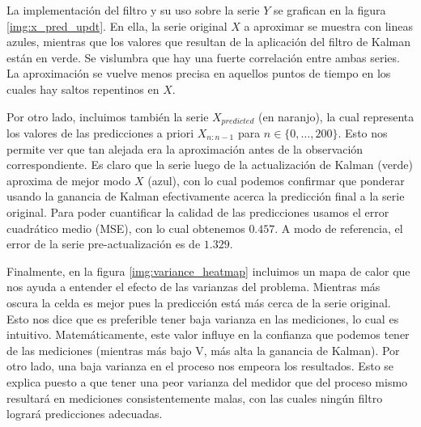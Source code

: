 \documentclass[letterpaper,11pt,oneside]{article}
\begin{document}


La implementación del filtro y su uso sobre la serie $Y$ se grafican en la figura \ref{img:x_pred_updt}. En ella, la serie original $X$ a aproximar se muestra con lineas azules, mientras que los valores que resultan de la aplicación del filtro de Kalman están en verde. Se vislumbra que hay una fuerte correlación entre ambas series. La aproximación se vuelve menos precisa en aquellos puntos de tiempo en los cuales hay saltos repentinos en $X$.

Por otro lado, incluimos también la serie $X_{predicted}$ (en \color{orange}naranjo\color{black}), la cual representa los valores de las predicciones a priori $X_{n:n-1}$ para $n\in\{0,\dots,200\}$. Esto nos permite ver que tan alejada era la aproximación antes de la observación correspondiente. Es claro que la serie luego de la actualización de Kalman (\color{green}verde\color{black}) aproxima de mejor modo $X$ (\color{blue}azul\color{black}), con lo cual podemos confirmar que ponderar usando la ganancia de Kalman efectivamente acerca la predicción final a la serie original. Para poder cuantificar la calidad de las predicciones usamos el error cuadrático medio (MSE), con lo cual obtenemos $0.457$. A modo de referencia, el error de la serie pre-actualización es de $1.329$.

Finalmente, en la figura \ref{img:variance_heatmap} incluimos un mapa de calor que nos ayuda a entender el efecto de las varianzas del problema. Mientras más oscura la celda es mejor pues la predicción está más cerca de la serie original. Esto nos dice que es preferible tener baja varianza en las mediciones, lo cual es intuitivo. Matemáticamente, este valor influye en la confianza que podemos tener de las mediciones (mientras más bajo V, más alta la ganancia de Kalman). Por otro lado, una baja varianza en el proceso nos empeora los resultados. Esto se explica puesto a que tener una peor varianza del medidor que del proceso mismo resultará en mediciones consistentemente malas, con las cuales ningún filtro logrará predicciones adecuadas.
\end{document}
